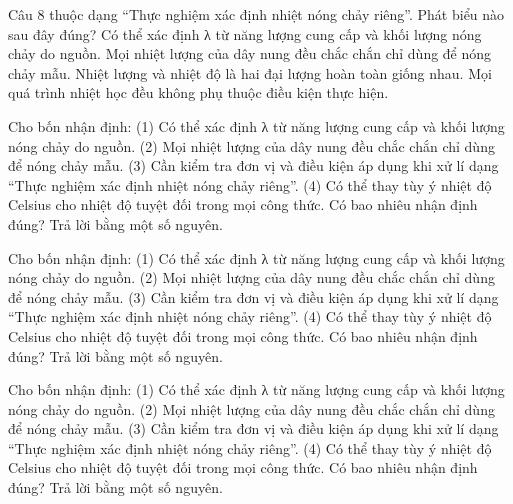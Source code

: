 \begin{ex}
Câu 8 thuộc dạng “Thực nghiệm xác định nhiệt nóng chảy riêng”. Phát biểu nào sau đây đúng?
\choice
{\True Có thể xác định λ từ năng lượng cung cấp và khối lượng nóng chảy do nguồn.}
{Mọi nhiệt lượng của dây nung đều chắc chắn chỉ dùng để nóng chảy mẫu.}
{Nhiệt lượng và nhiệt độ là hai đại lượng hoàn toàn giống nhau.}
{Mọi quá trình nhiệt học đều không phụ thuộc điều kiện thực hiện.}
\end{ex}

\begin{ex}
Cho bốn nhận định: (1) Có thể xác định λ từ năng lượng cung cấp và khối lượng nóng chảy do nguồn. (2) Mọi nhiệt lượng của dây nung đều chắc chắn chỉ dùng để nóng chảy mẫu. (3) Cần kiểm tra đơn vị và điều kiện áp dụng khi xử lí dạng “Thực nghiệm xác định nhiệt nóng chảy riêng”. (4) Có thể thay tùy ý nhiệt độ Celsius cho nhiệt độ tuyệt đối trong mọi công thức. Có bao nhiêu nhận định đúng? Trả lời bằng một số nguyên.
\end{ex}

\begin{ex}
Cho bốn nhận định: (1) Có thể xác định λ từ năng lượng cung cấp và khối lượng nóng chảy do nguồn. (2) Mọi nhiệt lượng của dây nung đều chắc chắn chỉ dùng để nóng chảy mẫu. (3) Cần kiểm tra đơn vị và điều kiện áp dụng khi xử lí dạng “Thực nghiệm xác định nhiệt nóng chảy riêng”. (4) Có thể thay tùy ý nhiệt độ Celsius cho nhiệt độ tuyệt đối trong mọi công thức. Có bao nhiêu nhận định đúng? Trả lời bằng một số nguyên.
\end{ex}

\begin{ex}
Cho bốn nhận định: (1) Có thể xác định λ từ năng lượng cung cấp và khối lượng nóng chảy do nguồn. (2) Mọi nhiệt lượng của dây nung đều chắc chắn chỉ dùng để nóng chảy mẫu. (3) Cần kiểm tra đơn vị và điều kiện áp dụng khi xử lí dạng “Thực nghiệm xác định nhiệt nóng chảy riêng”. (4) Có thể thay tùy ý nhiệt độ Celsius cho nhiệt độ tuyệt đối trong mọi công thức. Có bao nhiêu nhận định đúng? Trả lời bằng một số nguyên.
\end{ex}

